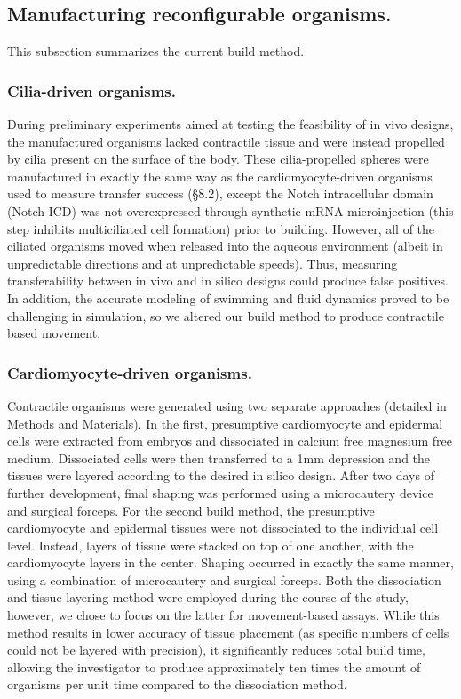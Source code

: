 \subsection*{Manufacturing reconfigurable organisms.}

This subsection summarizes the current build method.

\subsubsection*{Cilia-driven organisms.}

During preliminary experiments aimed at testing the feasibility of in vivo designs, the manufactured organisms lacked contractile tissue and were instead propelled by cilia present on the surface of the body. These cilia-propelled spheres were manufactured in exactly the same way as the cardiomyocyte-driven organisms used to measure transfer success (§8.2), except the Notch intracellular domain (Notch-ICD) was not overexpressed through synthetic mRNA microinjection (this step inhibits multiciliated cell formation) prior to building. However, all of the ciliated organisms moved when released into the aqueous environment (albeit in unpredictable directions and at unpredictable speeds). Thus, measuring transferability between in vivo and in silico designs could produce false positives. In addition, the accurate modeling of swimming and fluid dynamics proved to be challenging in simulation, so we altered our build method to produce contractile based movement.

\subsubsection*{Cardiomyocyte-driven organisms.}

Contractile organisms were generated using two separate approaches (detailed in Methods and Materials). In the first, presumptive cardiomyocyte and epidermal cells were extracted from embryos and dissociated in calcium free magnesium free medium. Dissociated cells were then transferred to a 1mm depression and the tissues were layered according to the desired in silico design. After two days of further development, final shaping was performed using a microcautery device and surgical forceps. For the second build method, the presumptive cardiomyocyte and epidermal tissues were not dissociated to the individual cell level. Instead, layers of tissue were stacked on top of one another, with the cardiomyocyte layers in the center. Shaping occurred in exactly the same manner, using a combination of microcautery and surgical forceps. 
Both the dissociation and tissue layering method were employed during the course of the study, however, we chose to focus on the latter for movement-based assays. While this method results in lower accuracy of tissue placement (as specific numbers of cells could not be layered with precision), it significantly reduces total build time, allowing the investigator to produce approximately ten times the amount of organisms per unit time compared to the dissociation method.


